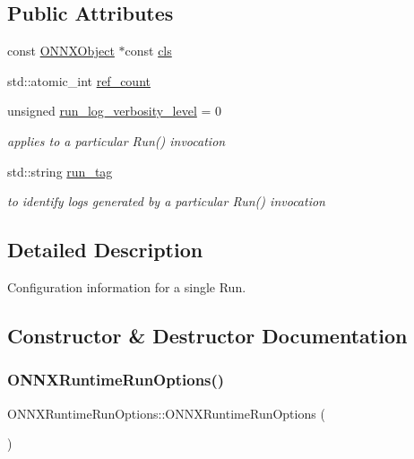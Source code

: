 \subsection*{Public Attributes}
\begin{DoxyCompactItemize}
\item 
const \mbox{\hyperlink{structONNXObject}{O\+N\+N\+X\+Object}} $\ast$const \mbox{\hyperlink{structONNXRuntimeRunOptions_a2906cd068fa80f795a9290588ff27efc}{cls}}
\item 
std\+::atomic\+\_\+int \mbox{\hyperlink{structONNXRuntimeRunOptions_a762d48d1bb2b7840b836489957d1e823}{ref\+\_\+count}}
\item 
unsigned \mbox{\hyperlink{structONNXRuntimeRunOptions_a386538b6ddbc2bf4496765ad846f53ee}{run\+\_\+log\+\_\+verbosity\+\_\+level}} = 0
\begin{DoxyCompactList}\small\item\em applies to a particular Run() invocation \end{DoxyCompactList}\item 
std\+::string \mbox{\hyperlink{structONNXRuntimeRunOptions_a99098c7d810216a1b1dab088cdf548e5}{run\+\_\+tag}}
\begin{DoxyCompactList}\small\item\em to identify logs generated by a particular Run() invocation \end{DoxyCompactList}\end{DoxyCompactItemize}


\subsection{Detailed Description}
Configuration information for a single Run. 

\subsection{Constructor \& Destructor Documentation}
\mbox{\label{structONNXRuntimeRunOptions_a58d2e67e2a2bdc71030e77c26fbc60c9}} 
\subsubsection{\texorpdfstring{O\+N\+N\+X\+Runtime\+Run\+Options()}{ONNXRuntimeRunOptions()}\hspace{0.1cm}{\footnotesize\ttfamily [1/2]}}
{\footnotesize\ttfamily O\+N\+N\+X\+Runtime\+Run\+Options\+::\+O\+N\+N\+X\+Runtime\+Run\+Options (\begin{DoxyParamCaption}{ }\end{DoxyParamCaption})}

